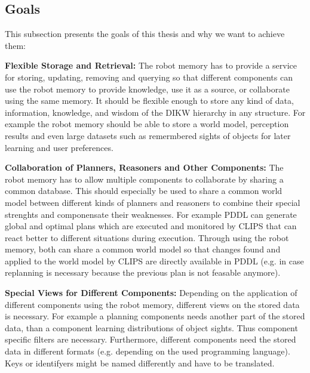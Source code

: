 \documentclass[a4paper,11pt]{article}
\begin{document}
\subsection{Goals}
\label{sec:goals}

This subsection presents the goals of this thesis and why we want to
achieve them:

\smallskip
\textbf{Flexible Storage and Retrieval:} The robot memory has to
provide a service for storing, updating, removing and querying so that
different components can use the robot memory to provide knowledge,
use it as a source, or collaborate using the same memory. It should be
flexible enough to store any kind of data, information, knowledge, and
wisdom of the DIKW hierarchy in any structure. For example the robot
memory should be able to store a world model, perception results and
even large datasets such as remermbered sights of objects for later
learning and user preferences.

\smallskip
\textbf{Collaboration of Planners, Reasoners and Other Components:}
The robot memory has to allow multiple components to collaborate by
sharing a common database. This should especially be used to share a
common world model between different kinds of planners and reasoners
to combine their special strenghts and componensate their
weaknesses. For example PDDL can generate global and optimal plans
which are executed and monitored by CLIPS that can react better to
different situations during execution. Through using the robot memory,
both can share a common world model so that changes found and applied
to the world model by CLIPS are directly available in PDDL (e.g. in
case replanning is necessary because the previous plan is not feasable
anymore).

\smallskip
\textbf{Special Views for Different Components:} Depending on the
application of different components using the robot memory, different
views on the stored data is necessary. For example a planning
components needs another part of the stored data, than a component
learning distributions of object sights. Thus component specific
filters are necessary. Furthermore, different components need the
stored data in different formats (e.g. depending on the used
programming language). Keys or identifyers might be named differently
and have to be translated.
\end{document}
